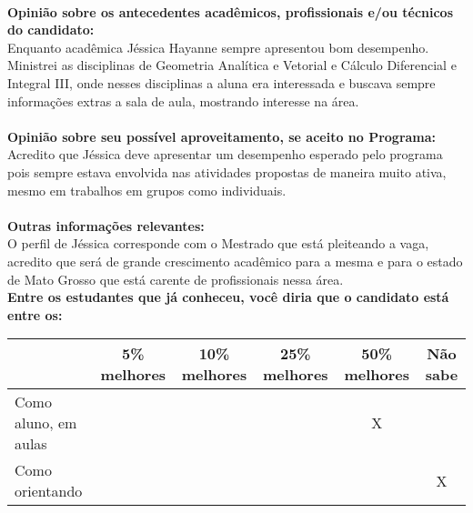 \documentclass[11pt]{article}
\begin{document}
\\
\textbf{Opinião sobre os antecedentes acadêmicos, profissionais e/ou técnicos do candidato:}
\\Enquanto acadêmica Jéssica Hayanne sempre apresentou bom desempenho. Ministrei as disciplinas de Geometria Analítica e Vetorial e Cálculo Diferencial e Integral III, onde nesses disciplinas a aluna era interessada  e buscava sempre informações extras a sala de aula, mostrando interesse na área.  \\
\\
\textbf{Opinião sobre seu possível aproveitamento, se aceito no Programa:}
\\Acredito que Jéssica deve apresentar um desempenho esperado pelo programa pois sempre estava envolvida nas atividades propostas de maneira muito ativa, mesmo em trabalhos em grupos como individuais.\\ 
\\
\textbf{Outras informações relevantes:} \\O perfil de Jéssica corresponde com o Mestrado que está pleiteando a vaga, acredito que será de grande crescimento acadêmico para a mesma e para o estado de Mato Grosso que está carente de profissionais nessa área. 
\\[0.3cm]
\textbf{Entre os estudantes que já conheceu, você diria que o candidato está entre os:}
\\
\begin{tabular}{|l|c|c|c|c|c|}
\hline
 & 5\% melhores & 10\% melhores & 25\% melhores & 50\% melhores & Não sabe \\
\hline
Como aluno, em aulas &  &  &  & X & \\
\hline
Como orientando &  &  &  &  & X\\
\hline
\end{tabular}
\end{document}

